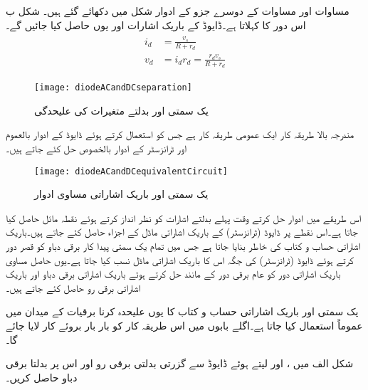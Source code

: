 مساوات   اور مساوات   کے دوسرے جزو کے ادوار شکل    میں دکھائے گئے ہیں۔
شکل  ب اس دور کا  کہلاتا ہے۔ڈایوڈ کے باریک اشارات  اور  یوں حاصل کیا جائیں گے۔
\begin{gather}
\begin{aligned}
i_d&=\frac{v_s}{R+r_d}\\
v_d&=i_d r_d=\frac{r_d v_s}{R+r_d}
\end{aligned}
\end{gather}
%
\begin{figure}
\centering
\texttt{[image: diodeACandDCseparation]}
\caption{یک سمتی اور بدلتے متغیرات کی علیحدگی}
\label{شکل_یک_سمتی_بدلتے_متغیرات_کی_علیحدگی}
\end{figure}
مندرجہ بالا طریقہ کار ایک عمومی طریقہ کار ہے جس کو استعمال کرتے ہوئے ڈایوڈ کے ادوار بالعموم اور ٹرانزسٹر کے ادوار بالخصوص حل کئے جاتے ہیں۔
\begin{figure}
\centering
\texttt{[image: diodeACandDCequivalentCircuit]}
\caption{یک سمتی اور باریک اشاراتی مساوی ادوار}
\label{شکل_یک_سمتی_اور_باریک_اشاراتی_مساوی_ادوار}
\end{figure}
اس طریقے میں ادوار حل کرتے وقت پہلے بدلتے اشارات کو نظر انداز کرتے ہوئے نقطہ مائل حاصل کیا جاتا ہے۔اس نقطے پر ڈایوڈ (ٹرانزسٹر) کے باریک اشاراتی ماڈل کے اجزاء حاصل کئے جاتے ہیں۔باریک اشاراتی حساب و کتاب کی خاطر  بنایا جاتا ہے جس میں تمام یک سمتی پیدا کار برقی دباو کو قصر دور کرتے ہوئے ڈایوڈ (ٹرانزسٹر)  کی جگہ اس کا باریک اشاراتی ماڈل نسب کیا جاتا ہے۔یوں حاصل مساوی باریک اشاراتی دور کو عام برقی دور کے مانند حل کرتے ہوئے باریک اشاراتی برقی دباو اور باریک اشاراتی برقی رو حاصل کئے جاتے ہیں۔

یک سمتی اور باریک اشاراتی حساب و کتاب کا یوں علیحدہ کرنا برقیات کے میدان میں عموماً استعمال کیا جاتا ہے۔اگلے بابوں میں اس طریقہ کار کو بار بار بروئے کار لایا جائے گا۔

شکل  الف میں  ،   اور  لیتے ہوئے ڈایوڈ سے گزرتی بدلتی برقی رو    اور اس پر بدلتا برقی دباو  حاصل کریں۔

